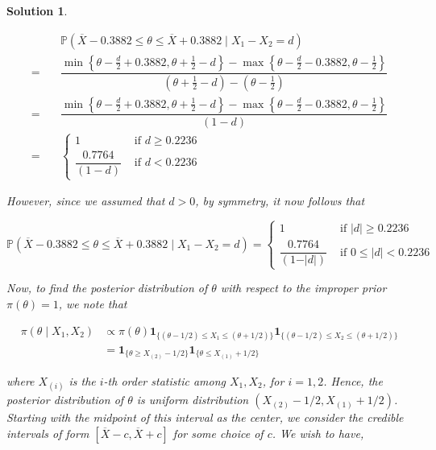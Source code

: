\documentclass[12pt]{article}
\theoremstyle{problemstyle}
\newtheorem*{solution*}{Solution}
\newcommand{\prob}{\mathbb{P}}
\newcommand{\ind}[1]{\mathbf{1}_{ \{#1\} }}
\begin{document}
\begin{solution*}
\begin{enumerate}
        \begin{align*}
            & \prob\left( \overline{X} - 0.3882 \leq \theta \leq \overline{X} + 0.3882 \mid X_1 - X_2 = d \right)\\
            = \quad & \dfrac{\min\left\{ \theta - \frac{d}{2} + 0.3882, \theta + \frac{1}{2} - d \right\} - \max\left\{ \theta - \frac{d}{2} - 0.3882, \theta - \frac{1}{2}\right\} }{(\theta + \frac{1}{2} - d) - (\theta - \frac{1}{2})}\\
            = \quad & \dfrac{\min\left\{ \theta - \frac{d}{2} + 0.3882, \theta + \frac{1}{2} - d \right\} - \max\left\{ \theta - \frac{d}{2} - 0.3882, \theta - \frac{1}{2}\right\} }{(1 - d)}\\
            = \quad & \begin{cases}
                1 & \text{ if } d \geq 0.2236\\
                \dfrac{0.7764}{(1 - d)} & \text{ if } d < 0.2236
            \end{cases}
        \end{align*}

        However, since we assumed that $d > 0$, by symmetry, it now follows that 

        $$
        \prob\left( \overline{X} - 0.3882 \leq \theta \leq \overline{X} + 0.3882 \mid X_1 - X_2 = d \right) 
        = \begin{cases}
            1 & \text{ if } \vert d \vert \geq 0.2236\\
            \dfrac{0.7764}{(1 - \vert d \vert)} & \text{ if } 0 \leq \vert d \vert < 0.2236
        \end{cases}
        $$

        Now, to find the posterior distribution of $\theta$ with respect to the improper prior $\pi(\theta) = 1$, we note that 

        \begin{align*}
            \pi(\theta \mid X_1, X_2)
            & \propto \pi(\theta) \ind{(\theta - 1/2) \leq X_1 \leq (\theta + 1/2)} \ind{(\theta - 1/2) \leq X_2 \leq (\theta + 1/2)}\\
            & = \ind{\theta \geq X_{(2)} - 1/2 }\ind{\theta \leq X_(1) + 1/2}
        \end{align*}

        where $X_{(i)}$ is the $i$-th order statistic among $X_1, X_2$, for $i = 1, 2$. Hence, the posterior distribution of $\theta$ is uniform distribution $\left( X_{(2)} - 1/2, X_{(1)} + 1/2 \right)$. Starting with the midpoint of this interval as the center, we consider the credible intervals of form $[\overline{X} - c, \overline{X} + c]$ for some choice of $c$. We wish to have,


\end{enumerate}
\end{solution*}
\end{document}
